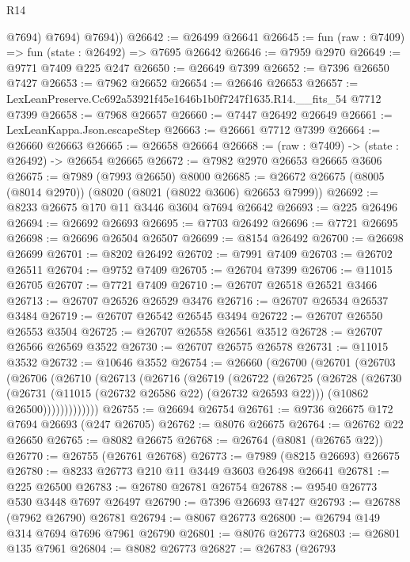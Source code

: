 \begin{lexlean}{R14}
\begin{coremodule}
            @7694)
          @7694)
        @7694))
@26642 := @26499 @26641
@26645 := fun (raw : @7409) => fun (state : @26492) => @7695 @26642
@26646 := @7959 @2970
@26649 := @9771 @7409 @225 @247
@26650 := @26649 @7399
@26652 := @7396 @26650 @7427
@26653 := @7962 @26652
@26654 := @26646 @26653
@26657 := LexLeanPreserve.Cc692a53921f45e1646b1b0f7247f1635.R14.__fits_54 @7712 @7399
@26658 := @7968 @26657
@26660 := @7447 @26492 @26649
@26661 := LexLeanKappa.Json.escapeStep
@26663 := @26661 @7712 @7399
@26664 := @26660 @26663
@26665 := @26658 @26664
@26668 := (raw : @7409) -> (state : @26492) -> @26654 @26665
@26672 := @7982 @2970 @26653 @26665 @3606
@26675 := @7989 (@7993 @26650) @8000
@26685 := @26672 @26675 (@8005 (@8014 @2970)) (@8020 (@8021 (@8022 @3606) @26653 @7999))
@26692 := @8233 @26675 @170 @11 @3446 @3604 @7694 @26642
@26693 := @225 @26496
@26694 := @26692 @26693
@26695 := @7703 @26492
@26696 := @7721 @26695
@26698 := @26696 @26504 @26507
@26699 := @8154 @26492
@26700 := @26698 @26699
@26701 := @8202 @26492
@26702 := @7991 @7409
@26703 := @26702 @26511
@26704 := @9752 @7409
@26705 := @26704 @7399
@26706 := @11015 @26705
@26707 := @7721 @7409
@26710 := @26707 @26518 @26521 @3466
@26713 := @26707 @26526 @26529 @3476
@26716 := @26707 @26534 @26537 @3484
@26719 := @26707 @26542 @26545 @3494
@26722 := @26707 @26550 @26553 @3504
@26725 := @26707 @26558 @26561 @3512
@26728 := @26707 @26566 @26569 @3522
@26730 := @26707 @26575 @26578
@26731 := @11015 @3532
@26732 := @10646 @3552
@26754 := @26660
    (@26700
      (@26701
        (@26703
          (@26706
            (@26710
              (@26713
                (@26716
                  (@26719
                    (@26722
                      (@26725
                        (@26728
                          (@26730
                            (@26731 (@11015 (@26732 @26586 @22) (@26732 @26593 @22)))
                            (@10862 @26500)))))))))))))
@26755 := @26694 @26754
@26761 := @9736 @26675 @172 @7694 @26693 (@247 @26705)
@26762 := @8076 @26675
@26764 := @26762 @22 @26650
@26765 := @8082 @26675
@26768 := @26764 (@8081 (@26765 @22))
@26770 := @26755 (@26761 @26768)
@26773 := @7989 (@8215 @26693) @26675
@26780 := @8233 @26773 @210 @11 @3449 @3603 @26498 @26641
@26781 := @225 @26500
@26783 := @26780 @26781 @26754
@26788 := @9540 @26773 @530 @3448 @7697 @26497
@26790 := @7396 @26693 @7427
@26793 := @26788 (@7962 @26790) @26781
@26794 := @8067 @26773
@26800 := @26794 @149 @314 @7694 @7696 @7961 @26790
@26801 := @8076 @26773
@26803 := @26801 @135 @7961
@26804 := @8082 @26773
@26827 := @26783
    (@26793

\end{coremodule}
\end{lexlean}
